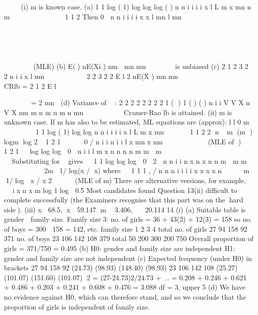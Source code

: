  


(i) m is known case.
(a) 1
1
log ( 1) log log log ( )
n
n i
i
i
i
x
l L m x mn n m 

      



1 1
2
Then 0 
n n
i i
i i
x x
l mn l
mn
   

  
 


   
 
(MLE)
(b) E() nE(Xi ) nm 
mn mn

    is unbiased
(c)
2
1
2 3 2 2
n
i
i
x
l mn  
  
  

2
2 3 2 2
E l 2 nE(X ) mn mn
  
       
 	  	 	 	
 CRlb =
2 1
2
E l
    
 		 

    

=
2
mn

(d) Variance of  :
2 2
2 2 2 2 2 2
1
( ) 1 ( ) ( )
n
i
i
V V X n V X nm
m n m n m n mn 
 
     
Cramer-Rao lb is attained.
(ii) m is unknown case.
If m has also to be estimated, ML equations are (approx):
l l 0
m
 
 
 
  1
1 log ( 1) log log
n
n i i
i i
x
l L m x mn 

     



1 1
2 2 n m (m ) logm log 2
1
2 1
     0 /
n
i i n
i i
l x mn x nm 


    
  

 (MLE of )
 
1
2
1
  log log log  0

n
i i
l m x n n n n m
m  m
   
     		    
 

Substituting for 
gives
 
1
1 log log log  0
 2 
n n
i i
n x n x n n m
 m m
 
     
 	

2m 1/ log(x / x) where  
1
1 1 , / n n n
i i i i x x x x n
 
   
 m 1/ log  x / x 2   
 (MLE of m)
There are alternative versions, for example,
 

i x
n
x
m
log 1 log
 0.5
Most candidates found Question 13(ii) difficult to complete successfully (the Examiners
recognise that this part was on the hard side).
(iii) x  68.5, x  59.147 m  3.406,   20.114
14 (i) (a) Suitable table is gender  family size.
Family size 3: no. of girls = 36 + 43(2) + 12(3) = 158
so no. of boys = 300  158 = 142, etc.
family size
1 2 3 4 total
no. of girls 27 94 158 92 371
no. of boys 23 106 142 108 379
total 50 200 300 200 750
Overall proportion of girls = 371/750 = 0.495
(b) H0: gender and family size are independent
H1: gender and family size are not independent
(c) Expected frequency (under H0) in brackets
27 94 158 92
(24.73) (98.93) (148.40) (98.93)
23 106 142 108
(25.27) (101.07) (151.60) (101.07)
2 = (27-24.73)2/24.73 + ..
= 0.208 + 0.246 + 0.621 + 0.486 +
0.203 + 0.241 + 0.608 + 0.476 = 3.088
df = 3, upper 5%
(d) We have no evidence against H0, which can therefore stand, and so we
conclude that the proportion of girls is independent of family size.
